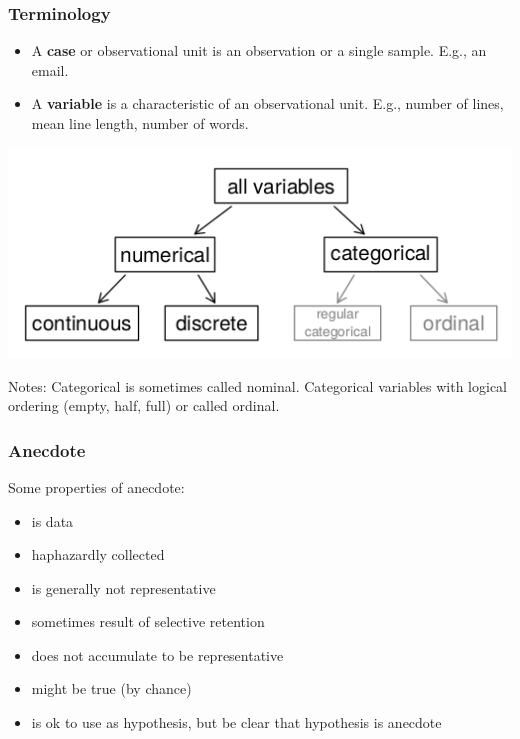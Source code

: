 \documentclass[t]{beamer}
\begin{document}
\begin{frame}
  \frametitle{Terminology}

  \begin{itemize}
  \item A \textbf{case} or {observational unit} is an observation or a
    single sample.  E.g., an email.
  \item A \textbf{variable} is a characteristic of an observational
    unit.  E.g., number of lines, mean line length, number of words.
  \end{itemize}
  \includegraphics[width=.9\textwidth]{variable-types.png}

  Notes:  Categorical is sometimes called nominal.  Categorical
  variables with logical ordering (empty, half, full) or called ordinal.
\end{frame}

\begin{frame}
  \frametitle{Anecdote}

  Some properties of anecdote:
  
  \begin{itemize}
  \item is data
  \item haphazardly collected
  \item is generally not representative
  \item sometimes result of selective retention
  \item does not accumulate to be representative
  \item might be true (by chance)
  \item is ok to use as hypothesis, but be clear that hypothesis is anecdote
  \end{itemize}
\end{frame}
\end{document}

